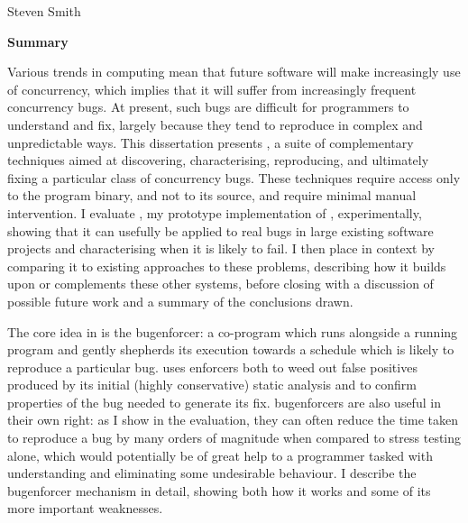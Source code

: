 \cleardoublepage
\begin{center}
\Large \mytitle
\end{center}
\begin{center}
\large Steven Smith
\end{center}
\vspace{10mm}
\begin{center}
\textbf{\large Summary}
\end{center}


\noindent
Various trends in computing mean that future software will make
increasingly use of concurrency, which implies that it will suffer
from increasingly frequent concurrency bugs.  At present, such bugs
are difficult for programmers to understand and fix, largely because
they tend to reproduce in complex and unpredictable ways.  This
dissertation presents {\technique}, a suite of complementary
techniques aimed at discovering, characterising, reproducing, and
ultimately fixing a particular class of concurrency bugs.  These
techniques require access only to the program binary, and not to its
source, and require minimal manual intervention.  I evaluate
{\implementation}, my prototype implementation of {\technique},
experimentally, showing that it can usefully be applied to real bugs
in large existing software projects and characterising when it is
likely to fail.  I then place {\technique} in context by comparing it
to existing approaches to these problems, describing how it builds
upon or complements these other systems, before closing with a
discussion of possible future work and a summary of the conclusions
drawn.

The core idea in {\technique} is the \gls{bugenforcer}: a co-program
which runs alongside a running program and gently shepherds its
execution towards a schedule which is likely to reproduce a particular
bug.  {\Technique} uses enforcers both to weed out false positives
produced by its initial (highly conservative) static analysis and to
confirm properties of the bug needed to generate its fix.
\Glspl{bugenforcer} are also useful in their own right: as I show in
the evaluation, they can often reduce the time taken to reproduce a
bug by many orders of magnitude when compared to stress testing alone,
which would potentially be of great help to a programmer tasked with
understanding and eliminating some undesirable behaviour.  I describe
the \gls{bugenforcer} mechanism in detail, showing both how it works
and some of its more important weaknesses.

\vspace*{\fill}

